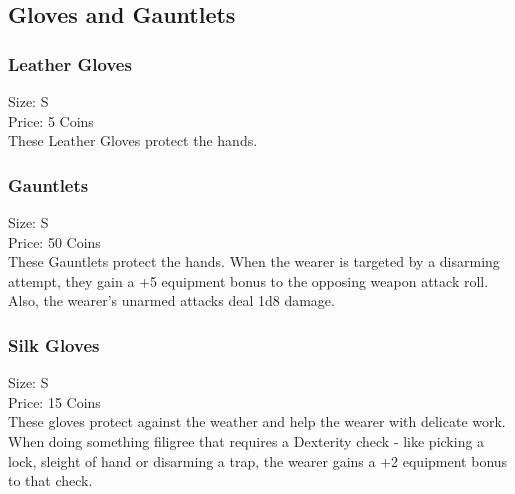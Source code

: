 \subsection{Gloves and Gauntlets}\label{subsec:gloves}

\subsubsection{Leather Gloves}\label{item:leathergloves}
Size: S\\
Price: 5 Coins\\
These Leather Gloves protect the hands.

\subsubsection{Gauntlets}\label{item:gauntlets}
Size: S\\
Price: 50 Coins\\
These Gauntlets protect the hands.
When the wearer is targeted by a disarming attempt, they gain a +5 equipment bonus to the opposing weapon attack roll.\\
Also, the wearer's unarmed attacks deal 1d8 damage.

\subsubsection{Silk Gloves}\label{item:silkgloves}
Size: S\\
Price: 15 Coins\\
These gloves protect against the weather and help the wearer with delicate work.
When doing something filigree that requires a Dexterity check - like picking a lock, sleight of hand or disarming a trap, the wearer gains a +2 equipment bonus to that check.